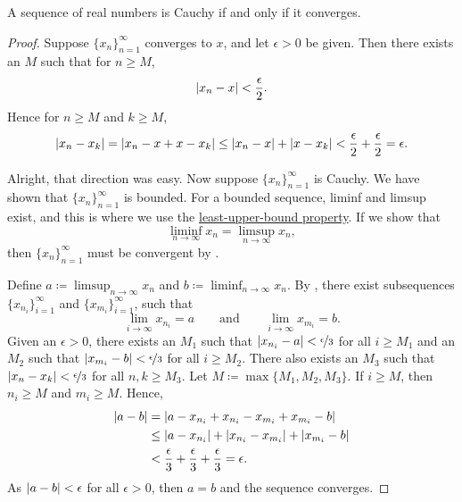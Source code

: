 \begin{thm}
A sequence of real numbers is Cauchy if and only if it converges.
\end{thm}

\begin{proof}
Suppose $\{ x_n \}_{n=1}^\infty$ converges to $x$,
and
let $\epsilon > 0$ be given.
Then there 
exists an $M$ such that for $n \geq M$,
\begin{equation*}
\left\lvert {x_n - x} \right\rvert < \frac{\epsilon}{2} .
\end{equation*}
Hence for $n \geq M$ and $k \geq M$,
\begin{equation*}
\left\lvert {x_n - x_k} \right\rvert = 
\left\lvert {x_n - x + x - x_k} \right\rvert
\leq \left\lvert {x_n-x} \right\rvert + \left\lvert {x-x_k} \right\rvert < \frac{\epsilon}{2} + \frac{\epsilon}{2} =
\epsilon .
\end{equation*}

Alright, that direction was easy.  Now suppose $\{ x_n \}_{n=1}^\infty$ is Cauchy.
We have shown that $\{ x_n \}_{n=1}^\infty$ is bounded.
For a bounded sequence, liminf and limsup exist, and this is
where we use the
\hyperref[defn:lub]{least-upper-bound property}.
If we show that
\begin{equation*}
\liminf_{n\to \infty} x_n = \limsup_{n\to\infty} x_n ,
\end{equation*}
then $\{ x_n \}_{n=1}^\infty$ must be convergent by .


Define $a \coloneqq \limsup_{n\to\infty} x_n$ and
$b \coloneqq \liminf_{n\to\infty} x_n$.
By , there exist subsequences
$\{ x_{n_i} \}_{i=1}^\infty$ and
$\{ x_{m_i} \}_{i=1}^\infty$, such that
\begin{equation*}
\lim_{i\to\infty} x_{n_i} = a
\qquad \text{and} \qquad
\lim_{i\to\infty} x_{m_i} = b.
\end{equation*}
Given an $\epsilon > 0$,
there exists an $M_1$ such that
$\left\lvert {x_{n_i} - a} \right\rvert < \nicefrac{\epsilon}{3}$ for all $i \geq M_1$
and an $M_2$ such that
$\left\lvert {x_{m_i} - b} \right\rvert < \nicefrac{\epsilon}{3}$ for all $i \geq M_2$.
There also exists an $M_3$
such that
$\left\lvert {x_n-x_k} \right\rvert < \nicefrac{\epsilon}{3}$
for all $n,k \geq M_3$.
Let $M \coloneqq \max \{ M_1, M_2, M_3 \}$.
If $i \geq M$, then $n_i \geq M$ and $m_i \geq M$.  Hence,
\begin{equation*}
\begin{split}
\left\lvert {a-b} \right\rvert & =
\left\lvert {a-x_{n_i}+x_{n_i}
-x_{m_i}+x_{m_i}
-b} \right\rvert \\
& \leq
\left\lvert {a-x_{n_i}} \right\rvert
+ \left\lvert {x_{n_i} -x_{m_i}} \right\rvert
+ \left\lvert {x_{m_i} -b} \right\rvert \\
& <
\frac{\epsilon}{3}
+
\frac{\epsilon}{3}
+
\frac{\epsilon}{3}
= \epsilon .
\end{split}
\end{equation*}
As $\left\lvert {a-b} \right\rvert < \epsilon$ for all $\epsilon > 0$, then $a=b$ and 
the sequence converges.
\end{proof}

